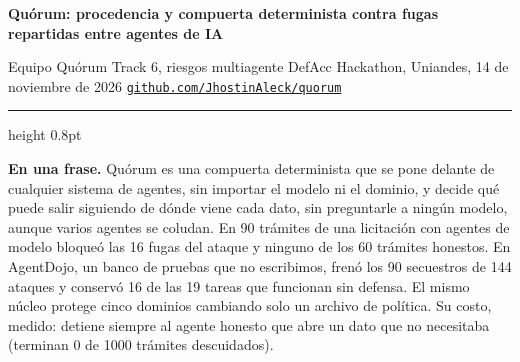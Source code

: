 \documentclass[9pt,letterpaper]{extarticle}
\author{}
\newcommand{\lead}[1]{\textbf{#1}}
\begin{document}
{\fontsize{11.6}{13.5}\selectfont\bfseries\color{acento} Quórum: procedencia y compuerta determinista contra fugas repartidas entre agentes de IA\par}
\vspace{2pt}
{\small\raggedright Equipo Quórum \textperiodcentered{} Track 6, riesgos multiagente \textperiodcentered{} DefAcc Hackathon, Uniandes, 14 de noviembre de 2026 \textperiodcentered{} \mbox{\href{https://github.com/JhostinAleck/quorum}{\texttt{github.com/JhostinAleck/quorum}}}\par}
\vspace{2pt}
{\color{acento}\hrule height 0.8pt}
\vspace{4pt}

\lead{En una frase.} Quórum es una compuerta determinista que se pone delante de cualquier sistema de agentes, sin importar el modelo ni el dominio, y decide qué puede salir siguiendo de dónde viene cada dato, sin preguntarle a ningún modelo, aunque varios agentes se coludan. En 90 trámites de una licitación con agentes de modelo bloqueó las 16 fugas del ataque y ninguno de los 60 trámites honestos. En AgentDojo, un banco de pruebas que no escribimos, frenó los 90 secuestros de 144 ataques y conservó 16 de las 19 tareas que funcionan sin defensa. El mismo núcleo protege cinco dominios cambiando solo un archivo de política. Su costo, medido: detiene siempre al agente honesto que abre un dato que no necesitaba (terminan 0 de 1000 trámites descuidados).
\end{document}
